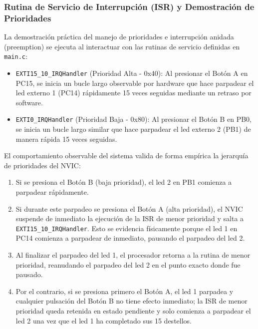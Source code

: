 \subsubsection{Rutina de Servicio de Interrupción (ISR) y Demostración de Prioridades}

La demostración práctica del manejo de prioridades e interrupción anidada (preemption) se ejecuta al interactuar
con las rutinas de servicio definidas en \texttt{main.c}:

\begin{itemize}
    \item \texttt{EXTI15\_10\_IRQHandler} (Prioridad Alta - 0x40): Al presionar el Botón A en PC15, se inicia un bucle
    largo observable por hardware que hace parpadear el led externo 1 (PC14) rápidamente 15 veces seguidas mediante
    un retraso por software.
    \item \texttt{EXTI0\_IRQHandler} (Prioridad Baja - 0x80): Al presionar el Botón B en PB0, se inicia un bucle largo
    similar que hace parpadear el led externo 2 (PB1) de manera rápida 15 veces seguidas.
\end{itemize}

El comportamiento observable del sistema valida de forma empírica la jerarquía de prioridades del NVIC:
\begin{enumerate}
    \item Si se presiona el Botón B (baja prioridad), el led 2 en PB1 comienza a parpadear rápidamente.
    \item Si durante este parpadeo se presiona el Botón A (alta prioridad), el NVIC suspende de inmediato la ejecución
    de la ISR de menor prioridad y salta a \texttt{EXTI15\_10\_IRQHandler}. Esto se evidencia físicamente porque el
    led 1 en PC14 comienza a parpadear de inmediato, pausando el parpadeo del led 2.
    \item Al finalizar el parpadeo del led 1, el procesador retorna a la rutina de menor prioridad, reanudando
    el parpadeo del led 2 en el punto exacto donde fue pausado.
    \item Por el contrario, si se presiona primero el Botón A, el led 1 parpadea y cualquier pulsación del Botón B
    no tiene efecto inmediato; la ISR de menor prioridad queda retenida en estado pendiente y solo comienza a
    parpadear el led 2 una vez que el led 1 ha completado sus 15 destellos.
\end{enumerate}



